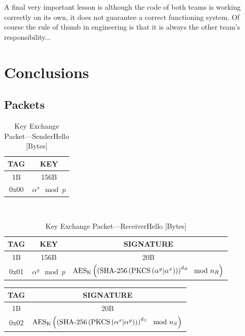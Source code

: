 \documentclass[a4paper]{article}
\begin{document}
A final very important lesson is although the code of both teams is working correctly on its own, it does not guarantee a correct functioning system. Of course the rule of thumb in engineering is that it is always the other team's responsibility...

\section{Conclusions}

\newpage

\begin{appendices}

\section{Packets}

\begin{table}[h!]
    \begin{center}
        \begin{tabular}{| c | c |}
            \hline
            TAG & KEY \\ \hline\hline
            1B & 156B \\ \hline
            0x00 & $\alpha^x\mod{p}$ \\
            \hline
        \end{tabular}
    \end{center}
    \
    \caption{Key Exchange Packet---SenderHello [Bytes]}
    \label{tab:key_exchange_packet_senderhello}
\end{table}
\begin{table}[h!]
    \begin{center}
        \begin{tabular}{| c | c | c |}
            \hline
            TAG & KEY & SIGNATURE \\ \hline\hline
            1B & 156B & 20B \\ \hline
            0x01 & $\alpha^y\mod{p}$ & $\text{AES}_\text{K}\left(\left(\text{SHA-256}\left(\text{PKCS}\left(\alpha^y\small|\alpha^x\right)\right)\right)^{d_R}\mod{n_R}\right)$\\
            \hline
        \end{tabular}
    \end{center}
    
    \caption{Key Exchange Packet---ReceiverHello [Bytes]}
    \label{tab:key_exchange_packet_receiverhello}
\end{table}
\begin{table}[h!]
    \begin{center}
        \begin{tabular}{| c | c |}
            \hline
            TAG & SIGNATURE \\ \hline\hline
            1B & 20B \\ \hline
            0x02 & $\text{AES}_\text{K}\left(\left(\text{SHA-256}\left(\text{PKCS}\left(\alpha^x \small|\alpha^y\right)\right)\right)^{d_S}\mod{n_S}\right)$\\
            \hline
        \end{tabular}
    \end{center}


\end{table}
\end{appendices}
\end{document}
